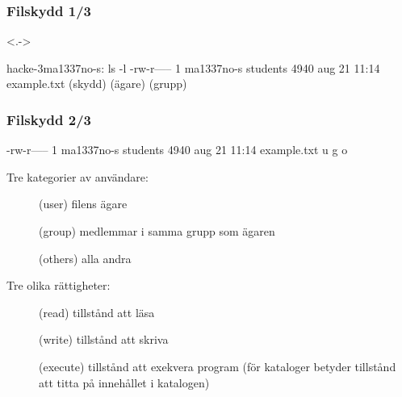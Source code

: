\begin{frame}[fragile,t]
    \frametitle{Filskydd 1/3}

    \begin{itemize}
    \end{itemize}

    \begin{itemize}
    \end{itemize}

    \begin{onlyenv}<.->
        \begin{GobbleCode}{10}
            hacke-3{ma1337no-s}: ls -l
            -rw-r-----  1 ma1337no-s  students  4940 aug 21 11:14 example.txt
             (skydd)       (ägare)     (grupp)
        \end{GobbleCode}
    \end{onlyenv}

\end{frame}


\begin{frame}[fragile]
    \frametitle{Filskydd 2/3}
    \begin{GobbleCode}{6}
        -rw-r-----  1 ma1337no-s  students  4940 aug 21 11:14 example.txt
          u  g  o
    \end{GobbleCode}

    Tre kategorier av användare:

    \begin{description}
        \item[] (user) filens ägare
        \item[] (group) medlemmar i samma grupp som ägaren
        \item[] (others) alla andra
    \end{description}

    Tre olika rättigheter:

    \begin{description}
        \item[] (read) tillstånd att läsa
        \item[] (write) tillstånd att skriva
        \item[] (execute) tillstånd att exekvera program (för kataloger betyder  tillstånd att titta på innehållet i katalogen)
    \end{description}

\end{frame}

